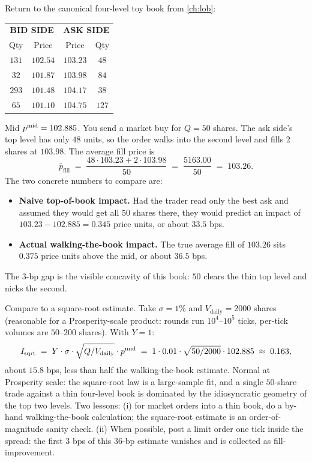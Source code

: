 \begin{prosperitybox}
Return to the canonical four-level toy book from \cref{ch:lob}:
\begin{center}
\begin{tabular}{cc|cc}
\toprule
\multicolumn{2}{c|}{\textbf{BID SIDE}} & \multicolumn{2}{c}{\textbf{ASK SIDE}} \\
Qty & Price & Price & Qty \\
\midrule
$131$ & $102.54$ & $103.23$ & $48$  \\
$32$  & $101.87$ & $103.98$ & $84$  \\
$293$ & $101.48$ & $104.17$ & $38$  \\
$65$  & $101.10$ & $104.75$ & $127$ \\
\bottomrule
\end{tabular}
\end{center}
Mid $p^{\mathrm{mid}} = 102.885$. You send a market buy for $Q = 50$ shares.
The ask side's top level has only $48$ units, so the order walks
into the second level and fills $2$ shares at $103.98$. The
average fill price is
\[
  \bar{p}_{\text{fill}}
  \;=\; \frac{48 \cdot 103.23 + 2 \cdot 103.98}{50}
  \;=\; \frac{5163.00}{50}
  \;=\; 103.26.
\]
The two concrete numbers to compare are:
\begin{itemize}
  \item \textbf{Naive top-of-book impact.} Had the trader read
  only the best ask and assumed they would get all $50$ shares
  there, they would predict an impact of $103.23 - 102.885 =
  0.345$ price units, or about $33.5$ bps.
  \item \textbf{Actual walking-the-book impact.} The true
  average fill of $103.26$ sits $0.375$ price units above the
  mid, or about $36.5$ bps.
\end{itemize}
The $3$-bp gap is the visible concavity of this book: $50$ clears
the thin top level and nicks the second.

Compare to a square-root estimate. Take $\sigma = 1\%$ and
$V_{\text{daily}} = 2000$ shares (reasonable for a Prosperity-scale
product: rounds run $10^4$--$10^5$ ticks, per-tick volumes are
$50$--$200$ shares). With $Y = 1$:
\[
  I_{\text{sqrt}} \;=\; Y \cdot \sigma \cdot \sqrt{Q / V_{\text{daily}}} \cdot p^{\mathrm{mid}}
  \;=\; 1 \cdot 0.01 \cdot \sqrt{50 / 2000} \cdot 102.885
  \;\approx\; 0.163,
\]
about $15.8$ bps, less than half the walking-the-book estimate.
Normal at Prosperity scale: the square-root law is a large-sample
fit, and a single $50$-share trade against a thin four-level book
is dominated by the idiosyncratic geometry of the top two levels.
Two lessons: (i) for market orders into a thin book, do a by-hand
walking-the-book calculation; the square-root estimate is an
order-of-magnitude sanity check. (ii) When possible, post a limit
order one tick inside the spread: the first $3$ bps of this $36$-bp
estimate vanishes and is collected as fill-improvement.
\end{prosperitybox}

